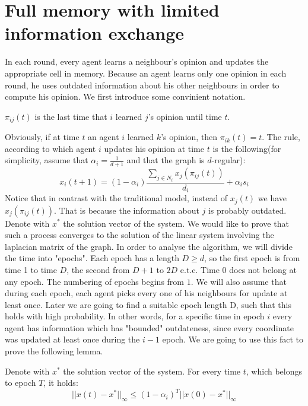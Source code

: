 \section{Full memory with limited information exchange}
In each round, every agent learns a neighbour's opinion and updates the appropriate cell in memory. Because an agent learns only one opinion in each round, he uses outdated information about his other neighbours in order to compute his opinion. We first introduce some convinient notation.
\begin{definition}
$\pi_{ij}(t)$ is the last time that $i$ learned $j$'s opinion until time $t$.
\end{definition}

Obviously, if at time $t$ an agent $i$ learned $k$'s opinion, then $\pi_{ik}(t) = t$. The rule, according to which agent $i$ updates his opinion at time $t$ is the following(for simplicity, assume that $\alpha_i = \frac{1}{d+1}$ and that the graph is $d$-regular):$$x_{i}(t+1)=(1-\alpha_i)\frac{\sum_{j \in N_i}x_j(\pi_{ij}(t))}{d_i}+\alpha_i s_i$$
Notice that in contrast with the traditional model, instead of $x_j(t)$ we have $x_j(\pi_{ij}(t))$. That is because the information about $j$ is probably outdated.
Denote with $x^*$ the solution vector of the system. We would like to prove that such a process converges to the solution of the linear system involving the laplacian matrix of the graph. In order to analyse the algorithm, we will divide the time into "epochs". Each epoch has a length $D \ge d$, so the first epoch is from time 1 to time $D$, the second from $D+1$ to $2D$ e.t.c. Time $0$ does not belong at any epoch. The numbering of epochs begins from $1$. We will also assume that during each epoch, each agent picks every one of his neighbours for update at least once. Later we are going to find a suitable epoch length D, such that this holds with high probability. In other words, for a specific time in epoch $i$ every agent has information which has "bounded" outdateness, since every coordinate was updated at least once during the $i-1$ epoch. We are going to use this fact to prove the following lemma.

\begin{lemma}
Denote with $x^*$ the solution vector of the system. For every time $t$, which belongs to epoch $T$, it holds:
$$ ||x(t)-x^*||_{\infty} \leq \left( 1-\alpha_i\right)^T||x(0)-x^*||_{\infty}$$
\end{lemma}


